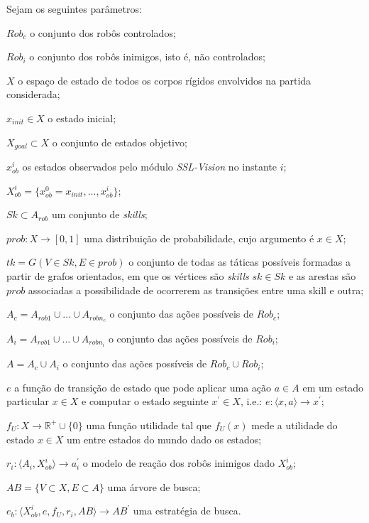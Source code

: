 \begin{defi}[Time]\label{def:time}
  Sejam os seguintes parâmetros:

  \begin{description}
    \item $Rob_c$ o conjunto dos robôs controlados;
    \item $Rob_i$ o conjunto dos robôs inimigos, isto é, não controlados;
    \item $X$ o espaço de estado de todos os corpos rígidos envolvidos na partida considerada;
    \item $x_{init} \in X$ o estado inicial;
    \item $X_{goal}\subset X$ o conjunto de estados objetivo;
    \item $x_{ob}^{i}$ os estados observados pelo módulo \textit{SSL-Vision} no instante $i$;
    \item $X_{ob}^{i} =  \lbrace{x_{ob}^{0} = x_{init},...,x_{ob}^{i}}\rbrace$;
    \item $Sk \subset A_{rob}$ um conjunto de \textit{skills};
    \item $prob: X \longrightarrow [0,1]$ uma distribuição de probabilidade, cujo argumento é
          $x \in X$;
    \item $tk = G(V \in Sk, E \in {prob} )$ o conjunto de todas as táticas possíveis
          formadas a partir de grafos orientados, em que os vértices são \textit{skills} $sk \in Sk$
          e as arestas são $prob$ associadas a possibilidade de ocorrerem as transições
          entre uma skill e outra;
    \item $A_c = A_{rob 1} \cup ... \cup A_{rob n_c}$ o conjunto das ações possíveis de $Rob_c$;
    \item $A_i = A_{rob 1} \cup ... \cup A_{rob n_i}$ o conjunto das ações possíveis de $Rob_i$;
    \item $A = A_c \cup A_i$ o conjunto das ações possíveis de $Rob_c \cup Rob_i$;
    \item $e$ a função de transição de estado que pode aplicar uma ação $a\in A$ em um estado particular
          $x \in X$ e computar o estado seguinte $x^{'} \in X$, i.e.:
          $e: \langle x,a \rangle \longrightarrow x^{'}$;
    \item $f_{U}: X \longrightarrow \mathbb{R^{+}} \cup\lbrace 0\rbrace$ uma função utilidade tal que
          $f_{U}(x)$ mede a utilidade do estado $x \in X$ um entre estados do mundo dado os estados;
    \item $r_i: \langle A_i, X_{ob}^{i}\rangle \longrightarrow a_i^{'}$ o modelo de reação dos robôs
          inimigos dado $X_{ob}^{i}$;
    \item $AB =\lbrace V \subset X, E \subset A\rbrace$ uma árvore de busca;
    \item $e_b: \langle X_{ob}^{i}, e, f_{U}, r_i, AB\rangle \longrightarrow AB^{'}$ uma estratégia de busca.


\end{description}
\end{defi}
